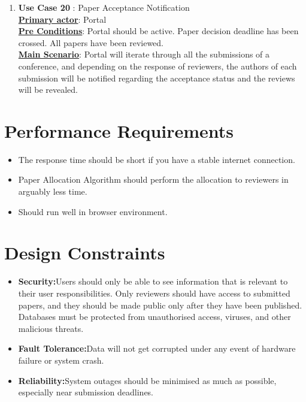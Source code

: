 \documentclass[english,a4paper,12pt]{report}
\begin{document}
\begin{enumerate}
\begin{enumerate}
    \item \textbf{Use Case 20 }: Paper Acceptance Notification \\
\underline{\textbf{Primary actor}}: Portal\\
\underline{\textbf{Pre Conditions}}: Portal should be active. Paper decision deadline has been crossed. All papers have been reviewed. \\ 
\underline{\textbf{Main Scenario}}:
Portal will iterate through all the submissions of a conference, and depending on the response of reviewers, the authors of each submission will be notified regarding the acceptance status and the reviews will be revealed.
\end{enumerate}

\end{enumerate}

\section{Performance Requirements}
\begin{itemize}
    \item The response time should be short if you have a stable internet connection.
    \item Paper Allocation Algorithm should perform the allocation to reviewers in arguably less time.
    \item Should run well in browser environment.
\end{itemize}



\section{Design Constraints}
\begin{itemize}
    \item \textbf{Security:}Users should only be able to see information that is relevant to their user responsibilities. Only reviewers should have access to submitted papers, and they should be made public only after they have been published. Databases must be protected from unauthorised access, viruses, and other malicious threats.
    \item \textbf{Fault Tolerance:}Data will not get corrupted under any event of hardware failure or system crash.
    \item \textbf{Reliability:}System outages should be minimised as much as possible, especially near submission deadlines.
\end{itemize}
\end{document}
